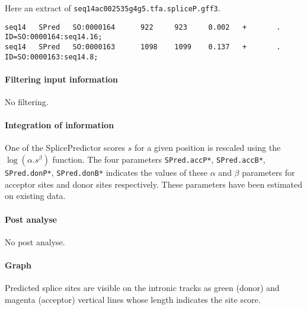 Here an extract of \texttt{seq14ac002535g4g5.tfa.spliceP.gff3}.
\begin{Verbatim}[fontsize=\tiny]
seq14   SPred   SO:0000164      922     923     0.002   +       .       ID=SO:0000164:seq14.16;
seq14   SPred   SO:0000163      1098    1099    0.137   +       .       ID=SO:0000163:seq14.8;
\end{Verbatim}

\paragraph{Filtering input information}

No filtering.

\paragraph{Integration of information}

One of the SplicePredictor scores $s$ for a given position is
rescaled using the $\log(\alpha.s^\beta)$ function. The four parameters
\texttt{SPred.accP*}, \texttt{SPred.accB*}, \texttt{SPred.donP*},
\texttt{SPred.donB*} indicates the values of these $\alpha$ and $\beta$
parameters for acceptor sites and donor sites respectively.  These
parameters have been estimated on existing data.

\paragraph{Post analyse}

No post analyse.

\paragraph{Graph}

Predicted splice sites are visible on the intronic tracks as green
(donor) and magenta (acceptor) vertical lines whose length indicates
the site score.
